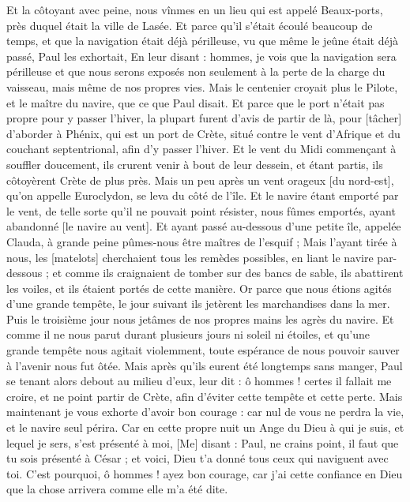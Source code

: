 \begin{multicols}{2}
Et la côtoyant avec peine, nous vînmes en un lieu qui est appelé Beaux-ports, près duquel était la ville de Lasée.
Et parce qu'il s'était écoulé beaucoup de temps, et que la navigation était déjà périlleuse, vu que même le jeûne était déjà passé, Paul les exhortait,
En leur disant : hommes, je vois que la navigation sera périlleuse et que nous serons exposés non seulement à la perte de la charge du vaisseau, mais même de nos propres vies.
Mais le centenier croyait plus le Pilote, et le maître du navire, que ce que Paul disait.
Et parce que le port n'était pas propre pour y passer l'hiver, la plupart furent d'avis de partir de là, pour [tâcher] d'aborder à Phénix, qui est un port de Crète, situé contre le vent d'Afrique et du couchant septentrional, afin d'y passer l'hiver.
Et le vent du Midi commençant à souffler doucement, ils crurent venir à bout de leur dessein, et étant partis, ils côtoyèrent Crète de plus près.
Mais un peu après un vent orageux [du nord-est], qu'on appelle Euroclydon, se leva du côté de l'île.
Et le navire étant emporté par le vent, de telle sorte qu'il ne pouvait point résister, nous fûmes emportés, ayant abandonné [le navire au vent].
Et ayant passé au-dessous d'une petite île, appelée Clauda, à grande peine pûmes-nous être maîtres de l'esquif ;
Mais l'ayant tirée à nous, les [matelots] cherchaient tous les remèdes possibles, en liant le navire par-dessous ; et comme ils craignaient de tomber sur des bancs de sable, ils abattirent les voiles, et ils étaient portés de cette manière.
Or parce que nous étions agités d'une grande tempête, le jour suivant ils jetèrent les marchandises dans la mer.
Puis le troisième jour nous jetâmes de nos propres mains les agrès du navire.
Et comme il ne nous parut durant plusieurs jours ni soleil ni étoiles, et qu'une grande tempête nous agitait violemment, toute espérance de nous pouvoir sauver à l'avenir nous fut ôtée.
Mais après qu'ils eurent été longtemps sans manger, Paul se tenant alors debout au milieu d'eux, leur dit : ô hommes ! certes il fallait me croire, et ne point partir de Crète, afin d'éviter cette tempête et cette perte.
Mais maintenant je vous exhorte d'avoir bon courage : car nul de vous ne perdra la vie, et le navire seul périra.
Car en cette propre nuit un Ange du Dieu à qui je suis, et lequel je sers, s'est présenté à moi,
[Me] disant : Paul, ne crains point, il faut que tu sois présenté à César ; et voici, Dieu t'a donné tous ceux qui naviguent avec toi.
C'est pourquoi, ô hommes ! ayez bon courage, car j'ai cette confiance en Dieu que la chose arrivera comme elle m'a été dite.

\end{multicols}
